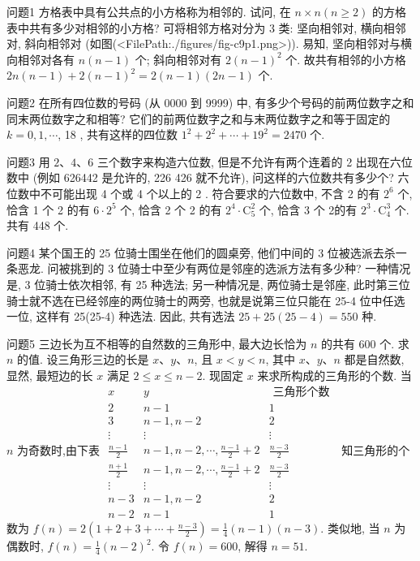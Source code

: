 
问题1 方格表中具有公共点的小方格称为相邻的.
试问, 在 $n \times n(n \geqslant 2)$ 的方格表中共有多少对相邻的小方格?
可将相邻方格对分为 3 类: 坚向相邻对, 横向相邻对, 斜向相邻对 (如图(<FilePath:./figures/fig-c9p1.png>)). 易知, 坚向相邻对与横向相邻对各有 $n(n-1)$ 个; 斜向相邻对有 $2(n-1)^2$ 个.
故共有相邻的小方格 $2 n(n-1)+2(n-1)^2=2(n-1)(2 n-1)$ 个.



问题2 在所有四位数的号码 (从 0000 到 9999) 中, 有多少个号码的前两位数字之和同末两位数字之和相等?
它们的前两位数字之和与末两位数字之和等于固定的 $k=0,1, \cdots$, 18 , 共有这样的四位数 $1^2+2^2+\cdots+19^2=2470$ 个.



问题3 用 $2 、 4 、 6$ 三个数字来构造六位数, 但是不允许有两个连着的 2 出现在六位数中 (例如 626442 是允许的, 226 426 就不允许), 问这样的六位数共有多少个?
六位数中不可能出现 4 个或 4 个以上的 2 . 符合要求的六位数中, 不含 2 的有 $2^6$ 个,恰含 1 个 2 的有 $6 \cdot 2^5$ 个, 恰含 2 个 2 的有 $2^4 \cdot \mathrm{C}_5^2$ 个, 恰含 3 个 2的有 $2^3 \cdot \mathrm{C}_4^3$ 个.
共有 448 个.



问题4 某个国王的 25 位骑士围坐在他们的圆桌旁, 他们中间的 3 位被选派去杀一条恶龙.
问被挑到的 3 位骑士中至少有两位是邻座的选派方法有多少种?
一种情况是, 3 位骑士依次相邻, 有 25 种选法; 另一种情况是, 两位骑士是邻座, 此时第三位骑士就不选在已经邻座的两位骑士的两旁, 也就是说第三位只能在 25-4 位中任选一位, 这样有 25(25-4) 种选法.
因此, 共有选法 $25+25(25-4)=550$ 种.



问题5 三边长为互不相等的自然数的三角形中, 最大边长恰为 $n$ 的共有 600 个.
求 $n$ 的值.
设三角形三边的长是 $x 、 y 、 n$, 且 $x<y<n$, 其中 $x 、 y 、 n$ 都是自然数, 显然, 最短边的长 $x$ 满足 $2 \leqslant x \leqslant n-2$. 现固定 $x$ 来求所构成的三角形的个数.
当 $n$ 为奇数时,由下表
$\begin{array}{ccc}x & y & \text { 三角形个数 } \\ 2 & n-1 & 1 \\ 3 & n-1, n-2 & 2 \\ \vdots & \vdots & \vdots \\ \frac{n-1}{2} & n-1, n-2, \cdots, \frac{n-1}{2}+2 & \frac{n-3}{2} \\ \frac{n+1}{2} & n-1, n-2, \cdots, \frac{n-1}{2}+2 & \frac{n-3}{2} \\ \vdots & \vdots & \vdots \\ n-3 & n-1, n-2 & 2 \\ n-2 & n-1 & 1 \end{array}$ 知三角形的个数为 $f(n)=2\left(1+2+3+\cdots+\frac{n-3}{2}\right)=\frac{1}{4}(n-1)(n-3)$. 类似地, 当 $n$ 为偶数时, $f(n)=\frac{1}{4}(n-2)^2$. 令 $f(n)=600$, 解得 $n=51$.



